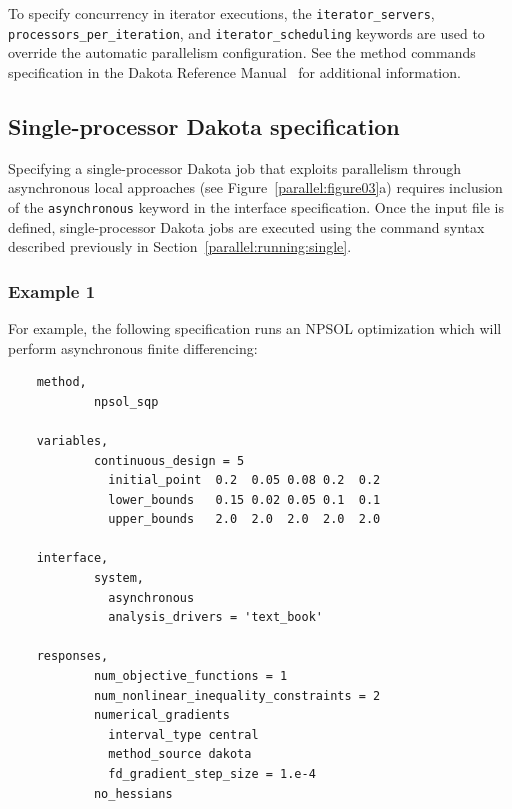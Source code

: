 To specify concurrency in iterator executions, the
\texttt{iterator\_servers}, \texttt{processors\_per\_iteration}, and
\texttt{iterator\_scheduling} keywords are used to override the 
automatic parallelism configuration. See the method commands 
specification in the Dakota Reference Manual~\cite{RefMan} for 
additional information.

\subsection{Single-processor Dakota specification}\label{parallel:spec:single}

Specifying a single-processor Dakota job that exploits parallelism
through asynchronous local approaches (see
Figure~\ref{parallel:figure03}a) requires inclusion of the
\texttt{asynchronous} keyword in the interface specification. Once the
input file is defined, single-processor Dakota jobs are executed using
the command syntax described previously in
Section~\ref{parallel:running:single}.

\subsubsection{Example 1}\label{parallel:spec:single:example1}

For example, the following specification runs an NPSOL optimization
which will perform asynchronous finite differencing:
\begin{small}
\begin{verbatim}
    method,
            npsol_sqp

    variables,
            continuous_design = 5
              initial_point  0.2  0.05 0.08 0.2  0.2
              lower_bounds   0.15 0.02 0.05 0.1  0.1
              upper_bounds   2.0  2.0  2.0  2.0  2.0

    interface,
            system,
              asynchronous
              analysis_drivers = 'text_book'

    responses,
            num_objective_functions = 1
            num_nonlinear_inequality_constraints = 2
            numerical_gradients
              interval_type central
              method_source dakota
              fd_gradient_step_size = 1.e-4
            no_hessians
\end{verbatim}
\end{small}

